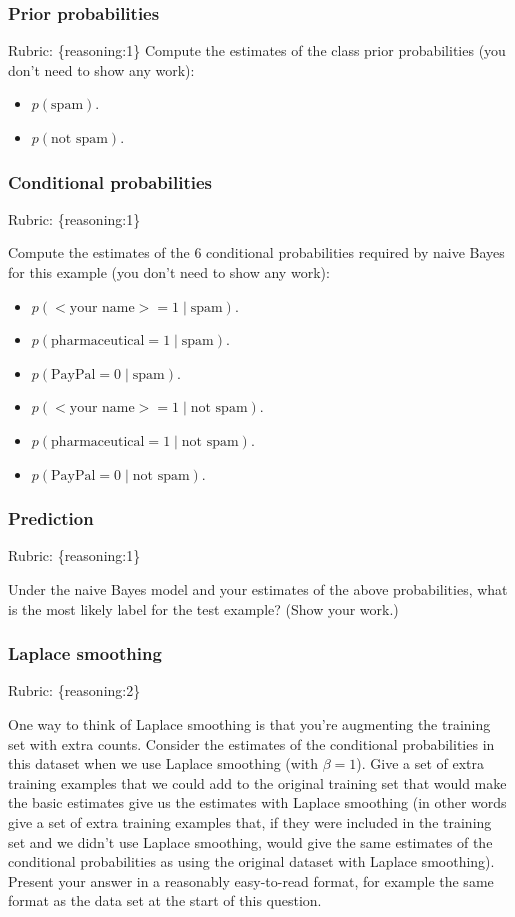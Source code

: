 \documentclass{article}
\def\rubric#1{\gre{Rubric: \{#1\}}}{}
\def\blu#1{{\color{blu}#1}}
\def\gre#1{{\color{gre}#1}}
\def\cond{\; | \;}
\def\items#1{\begin{itemize}#1\end{itemize}}
\begin{document}
\subsubsection{Prior probabilities}
\rubric{reasoning:1}
\blu{Compute the estimates of the class prior probabilities} (you don't need to show any work):
\items{
\item$ p(\text{spam})$.
\item $p(\text{not spam})$.
}

\subsubsection{Conditional probabilities}
\rubric{reasoning:1}

\blu{Compute the estimates of the 6 conditional probabilities required by naive Bayes for this example}  (you don't need to show any work):
\items{
\item $p(\text{$<$your name$>$} = 1  \cond \text{spam})$.
\item $p(\text{pharmaceutical} = 1 \cond \text{spam})$.
\item $p(\text{PayPal} = 0  \cond \text{spam})$.
\item $p(\text{$<$your name$>$} = 1  \cond \text{not spam})$.
\item $p(\text{pharmaceutical} = 1  \cond \text{not spam})$.
\item $p(\text{PayPal} = 0  \cond \text{not spam})$.
}

\subsubsection{Prediction}
\rubric{reasoning:1}

\blu{Under the naive Bayes model and your estimates of the above probabilities, what is the most likely label for the test example? (Show your work.)}

\subsubsection{Laplace smoothing}
\label{laplace.conceptual}
\rubric{reasoning:2}

One way to think of Laplace smoothing is that you're augmenting the training set with extra counts. Consider the estimates of the conditional probabilities in this dataset when we use Laplace smoothing (with $\beta = 1$). 
\blu{Give a set of extra training examples that we could add to the original training set that would make the basic estimates give us the estimates with Laplace smoothing} (in other words give a set of extra training examples that, if they were included in the training set and we didn't use Laplace smoothing, would give the same estimates of the conditional probabilities as using the original dataset with Laplace smoothing).
Present your answer in a reasonably easy-to-read format, for example the same format as the data set at the start of this question.
\end{document}
